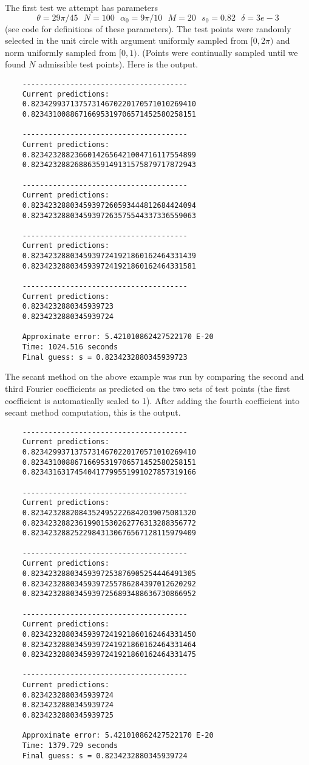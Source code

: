 \documentclass[]{article}
\begin{document}
The first test we attempt has parameters
$$
\theta = 29\pi/45 ~~~ N = 100 ~~~ \alpha_0 = 9\pi/10 ~~~ M = 20 ~~~ s_0 = 0.82 ~~~ \delta = 3e-3
$$
(see code for definitions of these parameters).
The test points were randomly selected in the unit circle with argument uniformly sampled from $[0, 2\pi)$ and norm uniformly sampled from $[0, 1)$.
(Points were continually sampled until we found $N$ admissible test points).
Here is the output.
\begin{verbatim}
	--------------------------------------
	Current predictions:
	0.82342993713757314670220170571010269410
	0.82343100886716695319706571452580258151
	
	--------------------------------------
	Current predictions:
	0.82342328823660142656421004716117554899
	0.82342328826886359149131575879717872943
	
	--------------------------------------
	Current predictions:
	0.82342328803459397260593444812684424094
	0.82342328803459397263575544337336559063
	
	--------------------------------------
	Current predictions:
	0.82342328803459397241921860162464331439
	0.82342328803459397241921860162464331581
	
	--------------------------------------
	Current predictions:
	0.8234232880345939723
	0.8234232880345939724
	
	Approximate error: 5.421010862427522170 E-20
	Time: 1024.516 seconds
	Final guess: s = 0.8234232880345939723
\end{verbatim}

The secant method on the above example was run by comparing the second and third Fourier coefficients as predicted on the two sets of test points (the first coefficient is automatically scaled to 1).
After adding the fourth coefficient into secant method computation, this is the output.
\begin{verbatim}
	--------------------------------------
	Current predictions:
	0.82342993713757314670220170571010269410
	0.82343100886716695319706571452580258151
	0.82343163174540417799551991027857319166
	
	--------------------------------------
	Current predictions:
	0.82342328820843524952226842039075081320
	0.82342328823619901530262776313288356772
	0.82342328825229843130676567128115979409
	
	--------------------------------------
	Current predictions:
	0.82342328803459397253876905254446491305
	0.82342328803459397255786284397012620292
	0.82342328803459397256893488636730866952
	
	--------------------------------------
	Current predictions:
	0.82342328803459397241921860162464331450
	0.82342328803459397241921860162464331464
	0.82342328803459397241921860162464331475
	
	--------------------------------------
	Current predictions:
	0.8234232880345939724
	0.8234232880345939724
	0.8234232880345939725
	
	Approximate error: 5.421010862427522170 E-20
	Time: 1379.729 seconds
	Final guess: s = 0.8234232880345939724
\end{verbatim}
\end{document}

